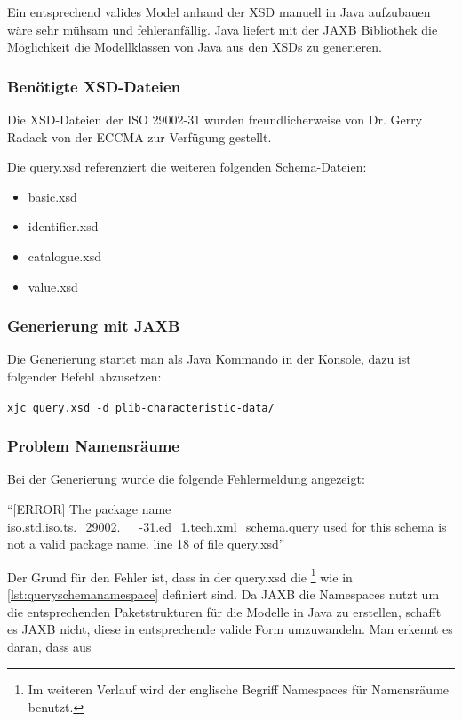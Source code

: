 Ein entsprechend valides Model anhand der XSD manuell in Java aufzubauen wäre sehr mühsam und fehleranfällig. Java liefert mit der \gls{JAXB} Bibliothek die Möglichkeit die Modellklassen von Java aus den XSDs zu generieren.

\subsubsection{Benötigte XSD-Dateien}

Die XSD-Dateien der ISO 29002-31 wurden freundlicherweise von Dr. Gerry Radack von der \gls{ECCMA} zur Verfügung gestellt. 

Die query.xsd referenziert die weiteren folgenden Schema-Dateien:
\begin{itemize}
\item basic.xsd
\item identifier.xsd
\item catalogue.xsd
\item value.xsd
\end{itemize}

\subsubsection{Generierung mit JAXB}

Die Generierung startet man als Java Kommando in der Konsole, dazu ist folgender Befehl abzusetzen:

\lstinline[basicstyle=\ttfamily\small\mdseries]{xjc query.xsd -d plib-characteristic-data/ }

\subsubsection{Problem Namensräume}
Bei der Generierung wurde die folgende Fehlermeldung angezeigt:

\enquote{[ERROR] The package name iso.std.iso.ts.\_29002.\_\_-31.ed\_1.tech.xml\_schema.query used for this schema is not a valid package name. line 18 of file query.xsd}
  
Der Grund für den Fehler ist, dass in der query.xsd die \footnote{Im weiteren Verlauf wird der englische Begriff Namespaces für Namensräume benutzt.} wie in  \autoref{lst:queryschemanamespace} definiert sind. Da JAXB die \Glspl{Namespace} nutzt um die entsprechenden Paketstrukturen für die Modelle in Java zu erstellen, schafft es JAXB nicht, diese in entsprechende valide Form umzuwandeln. Man erkennt es daran, dass aus 

